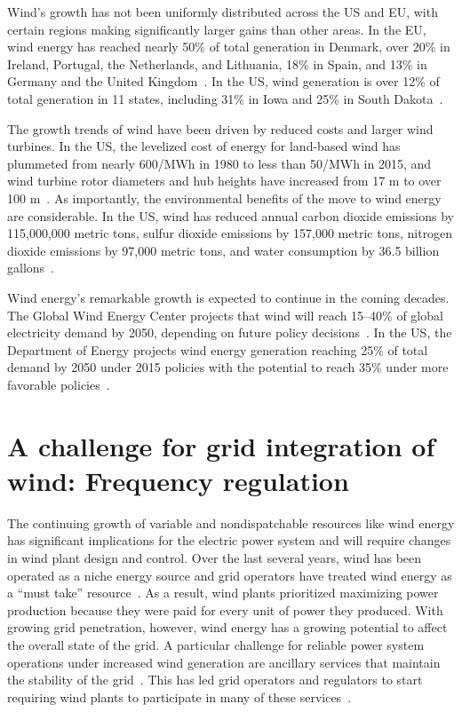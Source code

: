 Wind's growth has not been uniformly distributed across the US and EU, with certain regions making significantly larger gains than other areas. In the EU, wind energy has reached nearly 50\% of total generation in Denmark, over 20\% in Ireland, Portugal, the Netherlands, and Lithuania, 18\% in Spain, and 13\% in Germany and the United Kingdom~\cite{EIA2018a}. In the US, wind generation is over 12\% of total generation in 11 states, including 31\% in Iowa and 25\% in South Dakota~\cite{GWEC2016a}.

The growth trends of wind have been driven by reduced costs and larger wind turbines. In the US, the levelized cost of energy for land-based wind has plummeted from nearly 600/MWh in 1980 to less than 50/MWh in 2015, and wind turbine rotor diameters and hub heights have increased from 17 m to over 100 m~\cite{DOE2015a}. As importantly, the environmental benefits of the move to wind energy are considerable. In the US, wind has reduced annual carbon dioxide emissions by 115,000,000 metric tons, sulfur dioxide emissions by 157,000 metric tons, nitrogen dioxide emissions by 97,000 metric tons, and water consumption by 36.5 billion gallons~\cite{DOE2015a}.

Wind energy's remarkable growth is expected to continue in the coming decades. The Global Wind Energy Center projects that wind will reach 15--40\% of global electricity demand by 2050, depending on future policy decisions~\cite{GWEC2016a}. In the US, the Department of Energy projects wind energy generation reaching 25\% of total demand by 2050 under 2015 policies with the potential to reach 35\% under more favorable policies~\cite{DOE2015a}.

\section{A challenge for grid integration of wind: Frequency regulation}
\label{sec:intro-freq-reg}
The continuing growth of variable and nondispatchable resources like wind energy has significant implications for the electric power system and will require changes in wind plant design and control. Over the last several years, wind has been operated as a niche energy source and grid operators have treated wind energy as a ``must take'' resource~\cite{Gil2013a}. As a result, wind plants prioritized maximizing power production because they were paid for every unit of power they produced. With growing grid penetration, however, wind energy has a growing potential to affect the overall state of the grid. A particular challenge for reliable power system operations under increased wind generation are ancillary services that maintain the stability of the grid~\cite{DOE2015a}. This has led grid operators and regulators to start requiring wind plants to participate in many of these services~\cite{Aho2012a, DiazGonzalez2014a}. 

